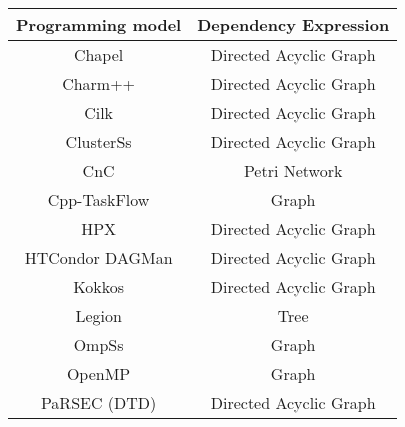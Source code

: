 \begin{tabular}{cc}
\hline
Programming model & Dependency Expression \\
\hline
Chapel & Directed Acyclic Graph\\
Charm++ & Directed Acyclic Graph\\
Cilk & Directed Acyclic Graph\\
ClusterSs & Directed Acyclic Graph\\
CnC & Petri Network\\
Cpp-TaskFlow & Graph\\
HPX & Directed Acyclic Graph\\
HTCondor DAGMan & Directed Acyclic Graph\\
Kokkos & Directed Acyclic Graph\\
Legion & Tree\\
OmpSs & Graph\\
OpenMP & Graph\\
PaRSEC (DTD) & Directed Acyclic Graph\\
\hline
\end{tabular}
